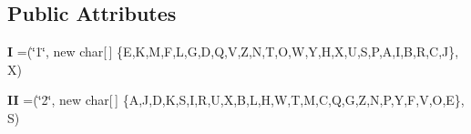 \subsection*{Public Attributes}
\begin{DoxyCompactItemize}
\item 
\mbox{\label{enumde_1_1_enigma_1_1_util_1_1_enums_1_1_e_mill_alphabet_af8844c7143464e031fe91ae2f65f3fef}} 
{\bfseries I} =(\char`\"{}1\char`\"{}, new char\mbox{[}$\,$\mbox{]} \{\textquotesingle{}E\textquotesingle{},\textquotesingle{}K\textquotesingle{},\textquotesingle{}M\textquotesingle{},\textquotesingle{}F\textquotesingle{},\textquotesingle{}L\textquotesingle{},\textquotesingle{}G\textquotesingle{},\textquotesingle{}D\textquotesingle{},\textquotesingle{}Q\textquotesingle{},\textquotesingle{}V\textquotesingle{},\textquotesingle{}Z\textquotesingle{},\textquotesingle{}N\textquotesingle{},\textquotesingle{}T\textquotesingle{},\textquotesingle{}O\textquotesingle{},\textquotesingle{}W\textquotesingle{},\textquotesingle{}Y\textquotesingle{},\textquotesingle{}H\textquotesingle{},\textquotesingle{}X\textquotesingle{},\textquotesingle{}U\textquotesingle{},\textquotesingle{}S\textquotesingle{},\textquotesingle{}P\textquotesingle{},\textquotesingle{}A\textquotesingle{},\textquotesingle{}I\textquotesingle{},\textquotesingle{}B\textquotesingle{},\textquotesingle{}R\textquotesingle{},\textquotesingle{}C\textquotesingle{},\textquotesingle{}J\textquotesingle{}\}, \textquotesingle{}X\textquotesingle{})
\item 
\mbox{\label{enumde_1_1_enigma_1_1_util_1_1_enums_1_1_e_mill_alphabet_a1b8bf26e36720f82afe92911ca386e5c}} 
{\bfseries II} =(\char`\"{}2\char`\"{}, new char\mbox{[}$\,$\mbox{]} \{\textquotesingle{}A\textquotesingle{},\textquotesingle{}J\textquotesingle{},\textquotesingle{}D\textquotesingle{},\textquotesingle{}K\textquotesingle{},\textquotesingle{}S\textquotesingle{},\textquotesingle{}I\textquotesingle{},\textquotesingle{}R\textquotesingle{},\textquotesingle{}U\textquotesingle{},\textquotesingle{}X\textquotesingle{},\textquotesingle{}B\textquotesingle{},\textquotesingle{}L\textquotesingle{},\textquotesingle{}H\textquotesingle{},\textquotesingle{}W\textquotesingle{},\textquotesingle{}T\textquotesingle{},\textquotesingle{}M\textquotesingle{},\textquotesingle{}C\textquotesingle{},\textquotesingle{}Q\textquotesingle{},\textquotesingle{}G\textquotesingle{},\textquotesingle{}Z\textquotesingle{},\textquotesingle{}N\textquotesingle{},\textquotesingle{}P\textquotesingle{},\textquotesingle{}Y\textquotesingle{},\textquotesingle{}F\textquotesingle{},\textquotesingle{}V\textquotesingle{},\textquotesingle{}O\textquotesingle{},\textquotesingle{}E\textquotesingle{}\}, \textquotesingle{}S\textquotesingle{})

\end{DoxyCompactItemize}
